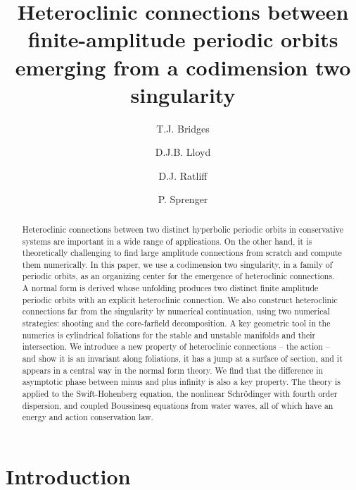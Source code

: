 \documentclass[10pt]{article}
\begin{document}
\title{Heteroclinic connections between finite-amplitude periodic orbits emerging from a codimension two singularity}
\author[1]{T.J. Bridges}
\author[1]{D.J.B. Lloyd}
\author[2]{D.J. Ratliff}
\author[3]{P. Sprenger}


\date{}
\maketitle

\begin{abstract}
\noindent Heteroclinic connections between two distinct hyperbolic periodic orbits in
conservative systems are important in a wide range of applications. On the other hand, it is theoretically challenging to find large amplitude connections from scratch and compute them numerically. In this paper,
we use a codimension two singularity, in a family of periodic orbits, as an
organizing center for the emergence of heteroclinic connections.  A normal form
is derived whose unfolding produces two distinct finite amplitude periodic
orbits with an explicit heteroclinic connection. We also construct heteroclinic connections far from the singularity by numerical
continuation, using two numerical strategies: shooting and the core-farfield
decomposition.  A key geometric tool in the numerics is cylindrical foliations for the stable and unstable manifolds and their intersection. We introduce a new property of heteroclinic connections -- the
action -- and show it is an invariant along foliations, it has a jump at a surface of section, and it appears in a central way in the normal form theory.  We find
that the difference in asymptotic phase between minus and plus infinity is also
a key property. The theory is applied to the Swift-Hohenberg equation, the nonlinear
Schr\"odinger with fourth order dispersion, and coupled Boussinesq equations
from water waves, all of which have an energy and action
conservation law.  

\end{abstract}

\section{Introduction}
\end{document}
